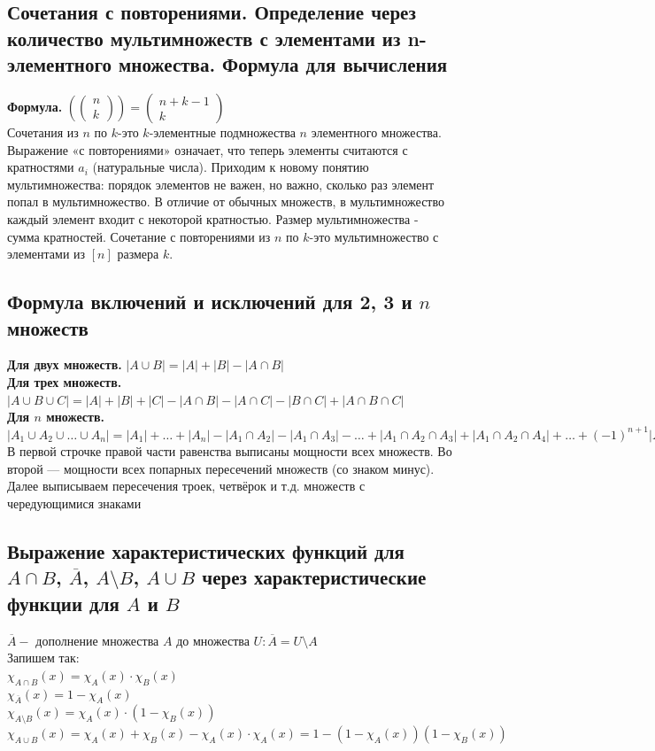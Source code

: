 \documentclass[a4paper]{article}
\begin{document}
\subsection{Сочетания с повторениями. Определение через количество мультимножеств с элементами из n-элементного множества. Формула для вычисления}
\textbf{Формула.} $\left(\begin{pmatrix}
    n\\
    k
\end{pmatrix}\right)=\begin{pmatrix}
    n+k-1\\
    k
\end{pmatrix}$\\[2mm]
\indent Сочетания из $n$ по $k$-это $k$-элементные подмножества $n$ элементного множества. Выражение «с повторениями» означает, что теперь элементы считаются с кратностями $a_{i}$ (натуральные числа). Приходим к новому понятию мультимножества: порядок элементов не важен, но важно, сколько раз элемент попал в мультимножество. В отличие от обычных множеств, в мультимножество каждый элемент входит с некоторой кратностью. Размер мультимножества - сумма кратностей. Сочетание с повторениями из $n$ по $k$-это мультимножество с элементами из $[n]$ размера $k$.
\subsection{Формула включений и исключений для 2, 3 и $n$ множеств}
\textbf{Для двух множеств.} $|A\cup B|=|A|+|B|-|A\cap B|$\\[2mm]
\textbf{Для трех множеств.} $|A\cup B\cup C|=|A|+|B|+|C|-|A\cap B|-|A\cap C|-|B\cap C|+|A\cap B\cap C|$\\[2mm]
\textbf{Для $n$ множеств.} $|A_1\cup A_2\cup\ldots\cup A_n|=|A_1|+\ldots+|A_n|-|A_1\cap A_2|-|A_1\cap A_3|-\ldots+|A_1\cap A_2\cap A_3|+|A_1\cap A_2\cap A_4|+\ldots+(-1)^{n+1}|A_1\cap A_2\cap\ldots\cap A_n|$\\[2mm]
\indent В первой строчке правой части равенства выписаны мощности всех множеств. Во второй — мощности всех попарных пересечений множеств (со знаком минус). Далее выписываем пересечения троек, четвёрок и т.д. множеств с чередующимися знаками
\subsection{ Выражение характеристических функций для $A\cap B$, $\overline{A}$, $A\setminus B$, $A\cup B$ через характеристические
функции для $A$ и $B$}
$\overline{A}-$ дополнение множества $A$ до множества $U: \overline{A}=U\setminus A$\\[2mm]
Запишем так:\\[2mm]
\indent $\chi_{A\cap B}(x)=\chi_A(x)\cdot\chi_B(x)$\\[2mm]
\indent $\chi_{\overline{A}}(x)=1-\chi_A(x)$\\[2mm]
\indent $\chi_{A\setminus B}(x)=\chi_A(x)\cdot(1-\chi_B(x))$\\[2mm]
\indent $\chi_{A\cup B}(x)=\chi_A(x)+\chi_B(x)-\chi_A(x)\cdot\chi_A(x)=1-(1-\chi_A(x))(1-\chi_B(x))$
\end{document}
